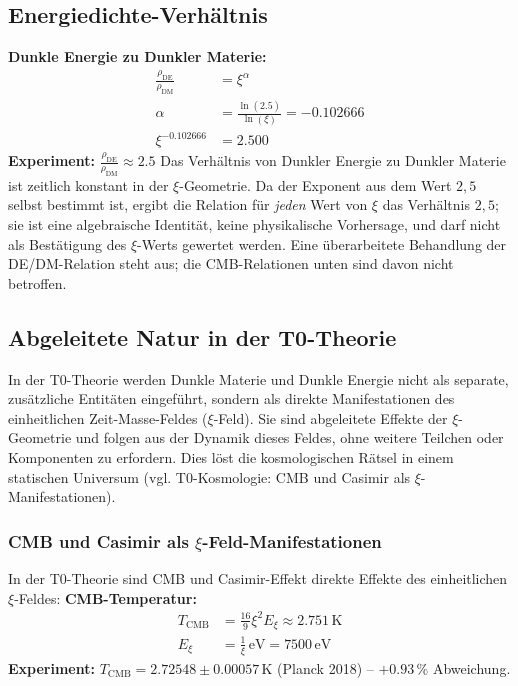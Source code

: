 	\subsection{Energiedichte-Verhältnis}
	\textbf{Dunkle Energie zu Dunkler Materie:}
	\begin{align}
		\frac{\rho_{\text{DE}}}{\rho_{\text{DM}}} &= \xi^{\alpha} \\
		\alpha &= \frac{\ln(2.5)}{\ln(\xi)} = -0.102666 \\
		\xi^{-0.102666} &= 2.500
	\end{align}
	\textbf{Experiment:} $\frac{\rho_{\text{DE}}}{\rho_{\text{DM}}} \approx 2.5$
	Das Verhältnis von Dunkler Energie zu Dunkler Materie ist zeitlich konstant in der $\xi$-Geometrie. Da der Exponent aus dem Wert $2{,}5$ selbst bestimmt ist, ergibt die Relation für \emph{jeden} Wert von $\xi$ das Verhältnis $2{,}5$; sie ist eine algebraische Identität, keine physikalische Vorhersage, und darf nicht als Bestätigung des $\xi$-Werts gewertet werden. Eine überarbeitete Behandlung der DE/DM-Relation steht aus; die CMB-Relationen unten sind davon nicht betroffen.
	
	\subsection{Abgeleitete Natur in der T0-Theorie}
	In der T0-Theorie werden Dunkle Materie und Dunkle Energie nicht als separate, zusätzliche Entitäten eingeführt, sondern als direkte Manifestationen des einheitlichen Zeit-Masse-Feldes ($\xi$-Feld). Sie sind abgeleitete Effekte der $\xi$-Geometrie und folgen aus der Dynamik dieses Feldes, ohne weitere Teilchen oder Komponenten zu erfordern. Dies löst die kosmologischen Rätsel in einem statischen Universum (vgl. T0-Kosmologie: CMB und Casimir als $\xi$-Manifestationen).
	
	\subsubsection{CMB und Casimir als $\xi$-Feld-Manifestationen}
	In der T0-Theorie sind CMB und Casimir-Effekt direkte Effekte des einheitlichen $\xi$-Feldes:
	\textbf{CMB-Temperatur:}
	\begin{align}
		T_{\text{CMB}} &= \frac{16}{9} \xi^2 E_\xi \approx 2.751\,\si{\kelvin} \\
		E_\xi &= \frac{1}{\xi}\,\si{\electronvolt} = 7500\,\si{\electronvolt}
	\end{align}
	\textbf{Experiment:} $T_{\text{CMB}} = 2.72548 \pm 0.00057\,\si{\kelvin}$ (Planck 2018) – $+0.93\,\%$ Abweichung.
	
